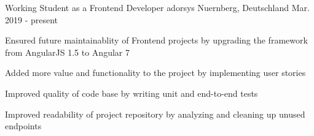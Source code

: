 
\begin{cventries}


  \cventry
    {Working Student as a Frontend Developer} %
    {adorsys} %
    {Nuernberg, Deutschland} %
    {Mar. 2019 - present} %
    {
      \begin{cvitems} %
        \item {Ensured future maintainablity of Frontend projects by upgrading the framework from AngularJS 1.5 to Angular 7}
        \item {Added more value and functionality to the project by implementing user stories}
        \item {Improved quality of code base by writing unit and end-to-end tests}
        \item {Improved readability of project repository by analyzing and cleaning up unused endpoints}
      \end{cvitems}
    }

\end{cventries}
